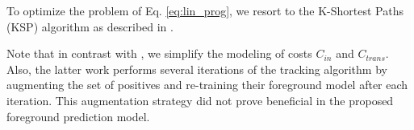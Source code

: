 To optimize the problem of Eq. \ref{eq:lin_prog}, we resort to the K-Shortest Paths (KSP) algorithm as described in \cite{lejeune18}.

Note that in contrast with \cite{lejeune18}, we simplify the modeling of costs $C_{in}$ and $C_{trans}$.
Also, the latter work performs several iterations of the tracking algorithm by augmenting the set of positives and re-training their foreground model after each iteration.
This augmentation strategy did not prove beneficial in the proposed foreground prediction model.


